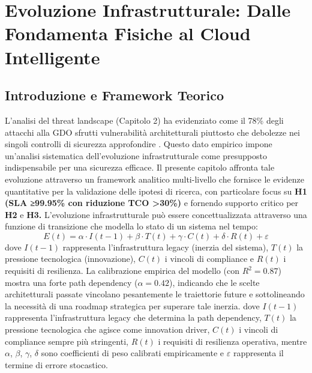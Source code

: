 \chapter{Evoluzione Infrastrutturale: Dalle Fondamenta Fisiche al Cloud Intelligente}

\section{ Introduzione e Framework Teorico}
L'analisi del threat landscape (Capitolo 2) ha evidenziato come il 78\% degli attacchi alla GDO sfrutti vulnerabilità architetturali piuttosto che debolezze nei singoli controlli di sicurezza approfondire \autocite{Anderson2024patel}. Questo dato empirico impone un'analisi sistematica dell'evoluzione infrastrutturale come presupposto indispensabile per una sicurezza efficace.
Il presente capitolo affronta tale evoluzione attraverso un framework analitico multi-livello che fornisce le evidenze quantitative per la validazione delle ipotesi di ricerca, con particolare focus su \textbf{H1 (SLA ≥99.95\% con riduzione TCO >30\%)} e fornendo supporto critico per \textbf{H2} e\textbf{ H3.}\cite{IDC2024}
L'evoluzione infrastrutturale può essere concettualizzata attraverso una funzione di transizione che modella lo stato di un sistema nel tempo:
\begin{equation}
E(t) = \alpha \cdot I(t-1) + \beta \cdot T(t) + \gamma \cdot C(t) + \delta \cdot R(t) + \varepsilon
\end{equation}
dove
$I(t-1)$ rappresenta l'infrastruttura legacy (inerzia del sistema), $T(t)$ la pressione tecnologica (innovazione), $C(t)$ i vincoli di compliance e $R(t)$ i requisiti di resilienza. 
La calibrazione empirica del modello (con $R^2=0.87$) mostra una forte path dependency ($\alpha=0.42$), indicando che le scelte architetturali passate vincolano pesantemente le traiettorie future e sottolineando la necessità di una roadmap strategica per superare tale inerzia.
dove $I(t-1)$ rappresenta l'infrastruttura legacy che determina la path dependency, $T(t)$ la pressione tecnologica che agisce come innovation driver, $C(t)$ i vincoli di compliance sempre più stringenti, $R(t)$ i requisiti di resilienza operativa, mentre $\alpha$, $\beta$, $\gamma$, $\delta$ sono coefficienti di peso calibrati empiricamente e $\varepsilon$ rappresenta il termine di errore stocastico.

